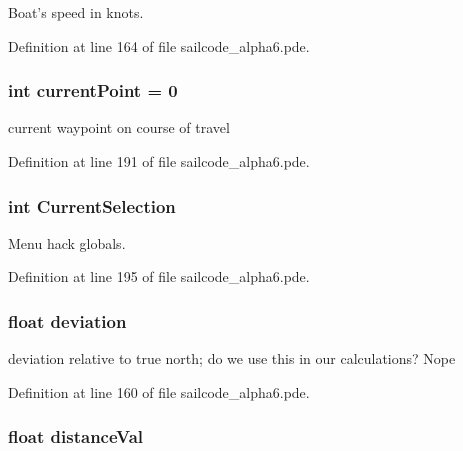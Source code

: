 \-Boat's speed in knots. 



\-Definition at line 164 of file sailcode\-\_\-alpha6.\-pde.

\hypertarget{group__group1_ga9c43dea25777e23791d530b06f6715f1}{
\subsubsection[{current\-Point}]{\setlength{\rightskip}{0pt plus 5cm}int {\bf current\-Point} = 0}}
\label{group__group1_ga9c43dea25777e23791d530b06f6715f1}


current waypoint on course of travel 



\-Definition at line 191 of file sailcode\-\_\-alpha6.\-pde.

\hypertarget{group__group1_ga79863a7d6b31d0c89c5050c2cd931cfe}{
\subsubsection[{\-Current\-Selection}]{\setlength{\rightskip}{0pt plus 5cm}int {\bf \-Current\-Selection}}}
\label{group__group1_ga79863a7d6b31d0c89c5050c2cd931cfe}


\-Menu hack globals. 



\-Definition at line 195 of file sailcode\-\_\-alpha6.\-pde.

\hypertarget{group__group1_gad20d9e23979c81b96a060830d0d460a6}{
\subsubsection[{deviation}]{\setlength{\rightskip}{0pt plus 5cm}float {\bf deviation}}}
\label{group__group1_gad20d9e23979c81b96a060830d0d460a6}


deviation relative to true north; do we use this in our calculations? \-Nope 



\-Definition at line 160 of file sailcode\-\_\-alpha6.\-pde.

\hypertarget{group__group1_ga90176c4024ce3ce161b5feda285f97c5}{
\subsubsection[{distance\-Val}]{\setlength{\rightskip}{0pt plus 5cm}float {\bf distance\-Val}}}
\label{group__group1_ga90176c4024ce3ce161b5feda285f97c5}


